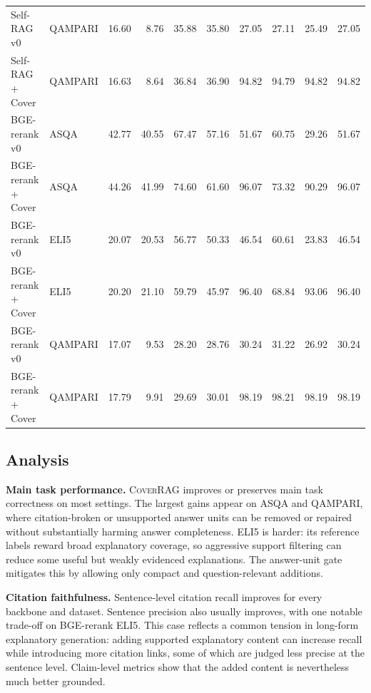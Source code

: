 \begin{table}[t]
\begin{tabular}{llrrrrrrrr}
        Self-RAG v0 & QAMPARI & 16.60 & 8.76 & 35.88 & 35.80 & 27.05 & 27.11 & 25.49 & 27.05 \\
        Self-RAG + Cover & QAMPARI & 16.63 & 8.64 & 36.84 & 36.90 & 94.82 & 94.79 & 94.82 & 94.82 \\
        \midrule
        BGE-rerank v0 & ASQA & 42.77 & 40.55 & 67.47 & 57.16 & 51.67 & 60.75 & 29.26 & 51.67 \\
        BGE-rerank + Cover & ASQA & 44.26 & 41.99 & 74.60 & 61.60 & 96.07 & 73.32 & 90.29 & 96.07 \\
        BGE-rerank v0 & ELI5 & 20.07 & 20.53 & 56.77 & 50.33 & 46.54 & 60.61 & 23.83 & 46.54 \\
        BGE-rerank + Cover & ELI5 & 20.20 & 21.10 & 59.79 & 45.97 & 96.40 & 68.84 & 93.06 & 96.40 \\
        BGE-rerank v0 & QAMPARI & 17.07 & 9.53 & 28.20 & 28.76 & 30.24 & 31.22 & 26.92 & 30.24 \\
        BGE-rerank + Cover & QAMPARI & 17.79 & 9.91 & 29.69 & 30.01 & 98.19 & 98.21 & 98.19 & 98.19 \\
        \bottomrule
    \end{tabular}
\end{table}

\subsection{Analysis}

\textbf{Main task performance.} \textsc{CoverRAG} improves or preserves main task correctness on most settings. The largest gains appear on ASQA and QAMPARI, where citation-broken or unsupported answer units can be removed or repaired without substantially harming answer completeness. ELI5 is harder: its reference labels reward broad explanatory coverage, so aggressive support filtering can reduce some useful but weakly evidenced explanations. The answer-unit gate mitigates this by allowing only compact and question-relevant additions.

\textbf{Citation faithfulness.} Sentence-level citation recall improves for every backbone and dataset. Sentence precision also usually improves, with one notable trade-off on BGE-rerank ELI5. This case reflects a common tension in long-form explanatory generation: adding supported explanatory content can increase recall while introducing more citation links, some of which are judged less precise at the sentence level. Claim-level metrics show that the added content is nevertheless much better grounded.

